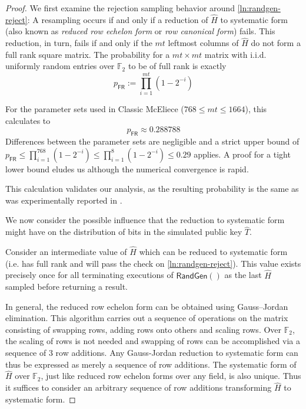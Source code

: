 \begin{proof}
    We first examine the rejection sampling behavior around \cref{ln:randgen-reject}: A resampling occurs if and only if a reduction of $\hat H$ to systematic form (also known as \emph{reduced row echelon form} or \emph{row canonical form}) fails. This reduction, in turn, fails if and only if the $mt$ leftmost columns of $\hat H$ do not form a full rank square matrix.
    The probability for a $mt \times mt$ matrix with i.i.d. uniformly random entries over $\mathbb F_2$ to be of full rank is exactly \cite{DBLP:journals/corr/SalmondGGC14}
    \[ p_\textsf{FR} := \prod_{i=1}^{mt} \left( 1-2^{-i} \right) \]
    
    For the parameter sets used in Classic McEliece ($768 \leq mt \leq 1664$), this calculates to \[ p_\textsf{FR} \approx 0.288788 \]
    Differences between the parameter sets are negligible and a strict upper bound of $p_\textsf{FR} \leq \prod_{i=1}^{768} \left( 1-2^{-i} \right) \leq \prod_{i=1}^{8} \left( 1-2^{-i} \right) \leq 0.29$ applies. A proof for a tight lower bound eludes us although the numerical convergence is rapid.
    
    This calculation validates our analysis, as the resulting probability is the same as was experimentally reported in \cite[security.pdf: Section 4.2]{NISTPQC-R4:ClassicMcEliece22}.
    
    We now consider the possible influence that the reduction to systematic form might have on the distribution of bits in the simulated public key $\hat T$.

    Consider an intermediate value of $\hat H$ which can be reduced to systematic form (i.e. has full rank and will pass the check on \cref{ln:randgen-reject}). This value exists precisely once for all terminating executions of $\textsf{RandGen}()$ as the last $\hat H$ sampled before returning a result.

    In general, the reduced row echelon form can be obtained using Gauss–Jordan elimination. This algorithm carries out a sequence of operations on the matrix consisting of swapping rows, adding rows onto others and scaling rows.
    Over $\mathbb F_2$, the scaling of rows is not needed and swapping of rows can be accomplished via a sequence of 3 row additions. Any Gauss-Jordan reduction to systematic form can thus be expressed as merely a sequence of row additions.
    The systematic form of $\hat H$ over $\mathbb F_2$, just like reduced row echelon forms over any field, is also unique. Thus it suffices to consider an arbitrary sequence of row additions transforming $\hat H$ to systematic form.
    

\end{proof}
